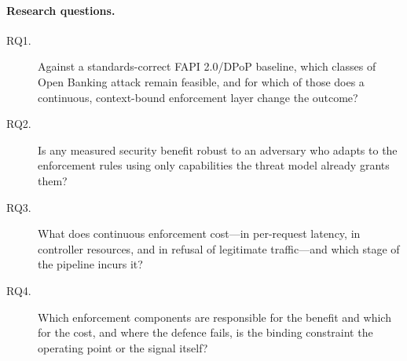\paragraph{Research questions.}
\begin{description}
  \item[RQ1.] Against a standards-correct FAPI 2.0/DPoP baseline, which classes of Open Banking attack remain feasible, and for which of those does a continuous, context-bound enforcement layer change the outcome?
  \item[RQ2.] Is any measured security benefit robust to an adversary who adapts to the enforcement rules using only capabilities the threat model already grants them?
  \item[RQ3.] What does continuous enforcement cost---in per-request latency, in controller resources, and in refusal of legitimate traffic---and which stage of the pipeline incurs it?
  \item[RQ4.] Which enforcement components are responsible for the benefit and which for the cost, and where the defence fails, is the binding constraint the operating point or the signal itself?
\end{description}

